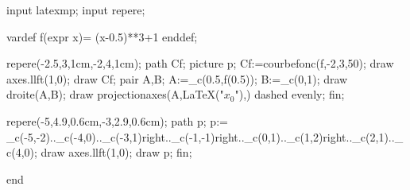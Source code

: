 input latexmp;
input repere;

vardef f(expr x)= (x-0.5)**3+1 enddef;

repere(-2.5,3,1cm,-2,4,1cm);
 path Cf; picture p;
 Cf:=courbefonc(f,-2,3,50);
 draw axes.llft(1,0);
 draw Cf;
 pair A,B;
 A:=_c(0.5,f(0.5));
 B:=_c(0,1);
 draw droite(A,B);
 draw projectionaxes(A,LaTeX("$x_0$"),) dashed evenly;
fin;



repere(-5,4.9,0.6cm,-3,2.9,0.6cm);
 path p;
 p:= _c(-5,-2).._c(-4,0).._c(-3,1){right}.._c(-1,-1){right}.._c(0,1).._c(1,2){right}.._c(2,1).._c(4,0);
 draw axes.llft(1,0);
 draw p;
fin;

end

